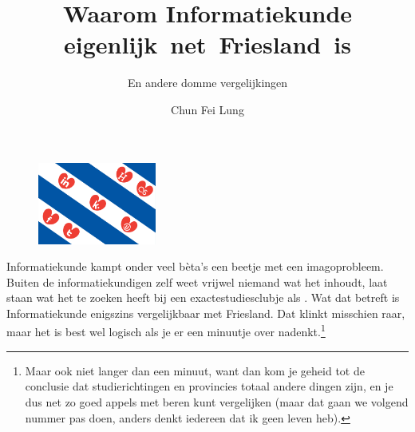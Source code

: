 \documentclass[print]{vakidioot}
\title   {Waarom Informatiekunde \mbox{eigenlijk net Friesland is}}
\subtitle{En andere domme vergelijkingen}
\author  {Chun Fei Lung}
\begin{document}
    \dummypagina

    \begin{figure}
        \vspace{.55cm}
        \includegraphics[width=3.9cm]{Friese-Vlag-(niet-die-van-de-zuivel)}
    \end{figure}
  
    \maketitle

    \begin{lead}
        Informatiekunde kampt onder veel bèta's een beetje met een imagoprobleem. Buiten de informatiekundigen zelf weet vrijwel niemand wat het inhoudt, laat staan wat het te zoeken heeft bij een exactestudiesclubje als \aesnaam. Wat dat betreft is Informatiekunde enigszins vergelijkbaar met Friesland. Dat klinkt misschien raar, maar het is best wel logisch als je er een minuutje over nadenkt.\footnote{Maar ook niet langer dan een minuut, want dan kom je geheid tot de conclusie dat studierichtingen en provincies totaal andere dingen zijn, en je dus net zo goed appels met beren kunt vergelijken (maar dat gaan we volgend nummer pas doen, anders denkt iedereen dat ik geen leven heb).}
    \end{lead}
  
\end{document}
